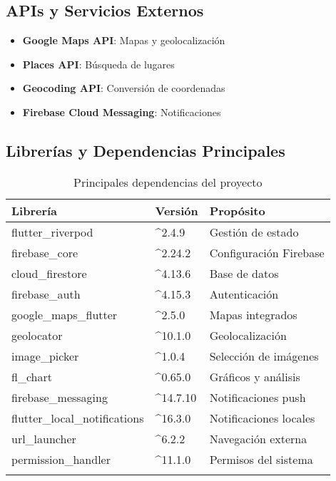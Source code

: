 \documentclass[12pt,a4paper]{article}
\begin{document}
\subsection{APIs y Servicios Externos}
\begin{itemize}[itemsep=0.5em]
    \item \textbf{Google Maps API}: Mapas y geolocalización
    \item \textbf{Places API}: Búsqueda de lugares
    \item \textbf{Geocoding API}: Conversión de coordenadas
    \item \textbf{Firebase Cloud Messaging}: Notificaciones
\end{itemize}

\subsection{Librerías y Dependencias Principales}
\begin{longtable}{@{}lll@{}}
\toprule
\textbf{Librería} & \textbf{Versión} & \textbf{Propósito} \\
\midrule
flutter\_riverpod & \textasciicircum{}2.4.9 & Gestión de estado \\
firebase\_core & \textasciicircum{}2.24.2 & Configuración Firebase \\
cloud\_firestore & \textasciicircum{}4.13.6 & Base de datos \\
firebase\_auth & \textasciicircum{}4.15.3 & Autenticación \\
google\_maps\_flutter & \textasciicircum{}2.5.0 & Mapas integrados \\
geolocator & \textasciicircum{}10.1.0 & Geolocalización \\
image\_picker & \textasciicircum{}1.0.4 & Selección de imágenes \\
fl\_chart & \textasciicircum{}0.65.0 & Gráficos y análisis \\
firebase\_messaging & \textasciicircum{}14.7.10 & Notificaciones push \\
flutter\_local\_notifications & \textasciicircum{}16.3.0 & Notificaciones locales \\
url\_launcher & \textasciicircum{}6.2.2 & Navegación externa \\
permission\_handler & \textasciicircum{}11.1.0 & Permisos del sistema \\
\bottomrule
\caption{Principales dependencias del proyecto}
\end{longtable}
\end{document}
